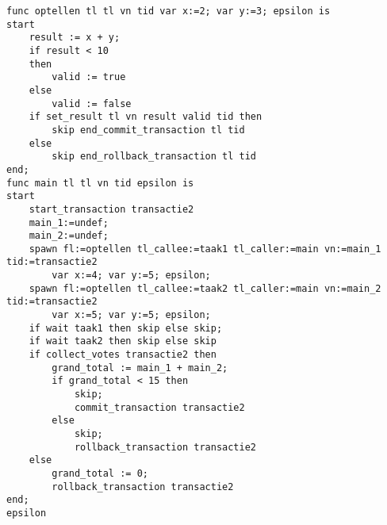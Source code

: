 \begin{lstlisting}[caption={Rollback}]
func optellen tl tl vn tid var x:=2; var y:=3; epsilon is
start
	result := x + y;
	if result < 10
	then
		valid := true
	else
		valid := false
	if set_result tl vn result valid tid then
		skip end_commit_transaction tl tid
	else
		skip end_rollback_transaction tl tid
end;
func main tl tl vn tid epsilon is
start
	start_transaction transactie2
	main_1:=undef;
	main_2:=undef;
	spawn fl:=optellen tl_callee:=taak1 tl_caller:=main vn:=main_1 tid:=transactie2
		var x:=4; var y:=5; epsilon;
	spawn fl:=optellen tl_callee:=taak2 tl_caller:=main vn:=main_2 tid:=transactie2
		var x:=5; var y:=5; epsilon;
	if wait taak1 then skip else skip;
	if wait taak2 then skip else skip
	if collect_votes transactie2 then
		grand_total := main_1 + main_2;
		if grand_total < 15 then
			skip;
			commit_transaction transactie2
		else
			skip;
			rollback_transaction transactie2
	else
		grand_total := 0;
		rollback_transaction transactie2
end;
epsilon
\end{lstlisting}

